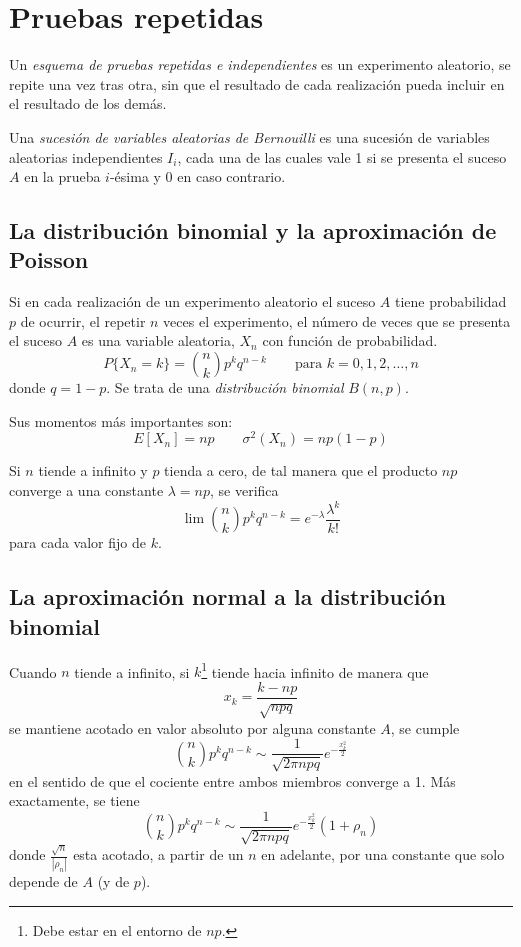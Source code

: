 \chapter{Pruebas repetidas}

Un \emph{esquema de pruebas repetidas e independientes} es un experimento aleatorio, se repite una vez tras otra, sin que el resultado de cada realización pueda incluir en el resultado de los demás.

Una \emph{sucesión de variables aleatorias de Bernouilli} es una sucesión de variables aleatorias independientes $I_i$, cada una de las cuales vale 1 si se presenta el suceso $A$ en la prueba $i$-ésima y 0 en caso contrario.

\section{La distribución binomial y la aproximación de Poisson}

Si en cada realización de un experimento aleatorio el suceso $A$ tiene probabilidad $p$ de ocurrir, el repetir $n$ veces el experimento, el número de veces que se presenta el suceso $A$ es una variable aleatoria, $X_n$ con función de probabilidad.
\[
P\{X_n = k\} = \binom{n}{k} p^kq^{n-k} \qquad \text{para } k=0,1,2,\ldots,n
\]
donde $q = 1-p$. Se trata de una \emph{distribución binomial} $B(n,p)$.

Sus momentos más importantes son:
\[
E[X_n] = np \qquad \sigma^2(X_n) = np(1-p)
\]

\begin{theorem}
    Si $n$ tiende a infinito y $p$ tienda a cero, de tal manera que el producto $np$ converge a una constante $\lambda=np$, se verifica
    \[
    \lim \binom{n}{k} p^k q^{n-k} = e^{-\lambda}\frac{\lambda^k}{k!}
    \]
    para cada valor fijo de $k$.
\end{theorem}

\section{La aproximación normal a la distribución binomial}

\begin{theorem}
    Cuando $n$ tiende a infinito, si $k$\footnote{Debe estar en el entorno de $np$.} tiende hacia infinito de manera que
    \[
    x_k=\frac{k-np}{\sqrt{npq}}
    \]
    se mantiene acotado en valor absoluto por alguna constante $A$, se cumple
    \[
    \binom{n}{k}p^k q^{n-k} \sim \frac{1}{\sqrt{2\pi npq}}e^{-\frac{x_k^2}{2}}
    \]
    en el sentido de que el cociente entre ambos miembros converge a 1. Más exactamente, se tiene
    \[
    \binom{n}{k}p^k q^{n-k} \sim \frac{1}{\sqrt{2\pi npq}}e^{-\frac{x_k^2}{2}}(1+\rho_n)
    \]
    donde $\frac{\sqrt{n}}{|\rho_n|}$ esta acotado, a partir de un $n$ en adelante, por una constante que solo depende de $A$ (y de $p$).
\end{theorem}